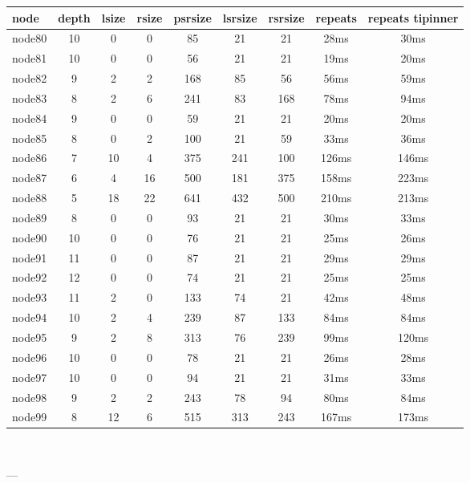 \begin{tabular}{|l|c|c|c|c|c|c|c|c|}
\hline node & depth & lsize & rsize & psrsize & lsrsize & rsrsize   & repeats & repeats tipinner\\
    \hline node80 & 10 & 0 & 0 & 85 & 21 & 21 & 28ms & 30ms\\
    \hline node81 & 10 & 0 & 0 & 56 & 21 & 21 & 19ms & 20ms\\
    \hline node82 & 9 & 2 & 2 & 168 & 85 & 56 & 56ms & 59ms\\
    \hline node83 & 8 & 2 & 6 & 241 & 83 & 168 & 78ms & 94ms\\
    \hline node84 & 9 & 0 & 0 & 59 & 21 & 21 & 20ms & 20ms\\
    \hline node85 & 8 & 0 & 2 & 100 & 21 & 59 & 33ms & 36ms\\
    \hline node86 & 7 & 10 & 4 & 375 & 241 & 100 & 126ms & 146ms\\
    \hline node87 & 6 & 4 & 16 & 500 & 181 & 375 & 158ms & 223ms\\
    \hline node88 & 5 & 18 & 22 & 641 & 432 & 500 & 210ms & 213ms\\
    \hline node89 & 8 & 0 & 0 & 93 & 21 & 21 & 30ms & 33ms\\
    \hline node90 & 10 & 0 & 0 & 76 & 21 & 21 & 25ms & 26ms\\
    \hline node91 & 11 & 0 & 0 & 87 & 21 & 21 & 29ms & 29ms\\
    \hline node92 & 12 & 0 & 0 & 74 & 21 & 21 & 25ms & 25ms\\
    \hline node93 & 11 & 2 & 0 & 133 & 74 & 21 & 42ms & 48ms\\
    \hline node94 & 10 & 2 & 4 & 239 & 87 & 133 & 84ms & 84ms\\
    \hline node95 & 9 & 2 & 8 & 313 & 76 & 239 & 99ms & 120ms\\
    \hline node96 & 10 & 0 & 0 & 78 & 21 & 21 & 26ms & 28ms\\
    \hline node97 & 10 & 0 & 0 & 94 & 21 & 21 & 31ms & 33ms\\
    \hline node98 & 9 & 2 & 2 & 243 & 78 & 94 & 80ms & 84ms\\
    \hline node99 & 8 & 12 & 6 & 515 & 313 & 243 & 167ms & 173ms\\

\hline
\end{tabular} \

---


